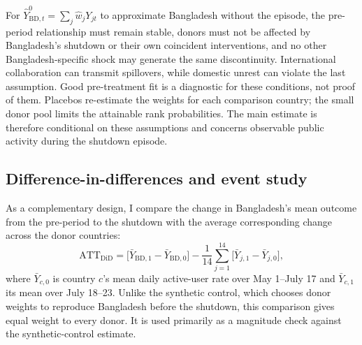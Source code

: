 For $\widehat Y^0_{\mathrm{BD},t}=\sum_j\widehat w_jY_{jt}$ to approximate Bangladesh without the episode, the pre-period relationship must remain stable, donors must not be affected by Bangladesh's shutdown or their own coincident interventions, and no other Bangladesh-specific shock may generate the same discontinuity. International collaboration can transmit spillovers, while domestic unrest can violate the last assumption. Good pre-treatment fit is a diagnostic for these conditions, not proof of them. Placebos re-estimate the weights for each comparison country; the small donor pool limits the attainable rank probabilities. The main estimate is therefore conditional on these assumptions and concerns observable public activity during the shutdown episode.

\subsection{Difference-in-differences and event study}
\label{sec:did}

As a complementary design, I compare the change in Bangladesh's mean outcome from the pre-period to the shutdown with the average corresponding change across the donor countries:
\begin{equation}
  \mathrm{ATT}_{\mathrm{DiD}} = \bigl[\bar{Y}_{\mathrm{BD},1} - \bar{Y}_{\mathrm{BD},0}\bigr]
  - \frac{1}{14}\sum_{j=1}^{14}\bigl[\bar{Y}_{j,1} - \bar{Y}_{j,0}\bigr],
  \label{eq:did_agg}
\end{equation}
where $\bar{Y}_{c,0}$ is country $c$'s mean daily active-user rate over May 1--July 17 and $\bar{Y}_{c,1}$ its mean over July 18--23. Unlike the synthetic control, which chooses donor weights to reproduce Bangladesh before the shutdown, this comparison gives equal weight to every donor. It is used primarily as a magnitude check against the synthetic-control estimate.

